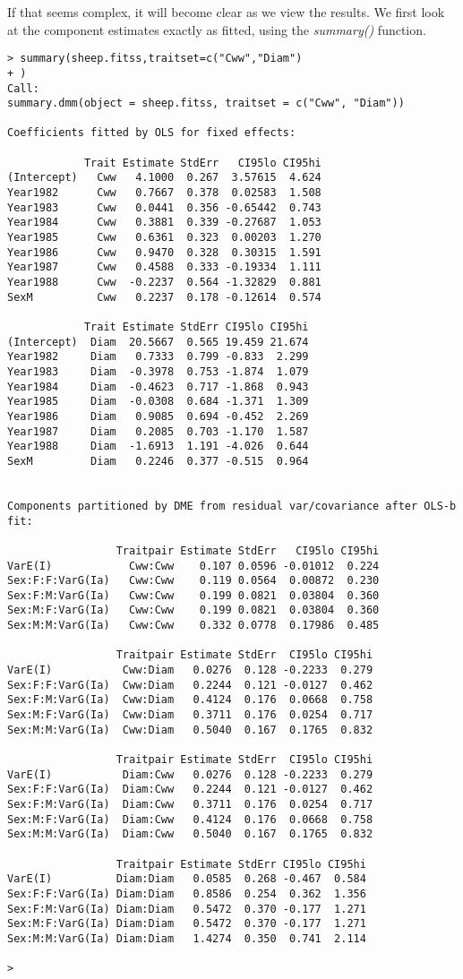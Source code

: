 \documentclass[titlepage]{article}  %
\begin{document}
If that seems complex, it will become clear as we view the results. We first look at the component estimates exactly as fitted, using the {\em summary()} function.
\begin{verbatim}
> summary(sheep.fitss,traitset=c("Cww","Diam")
+ )
Call:
summary.dmm(object = sheep.fitss, traitset = c("Cww", "Diam"))

Coefficients fitted by OLS for fixed effects:

            Trait Estimate StdErr   CI95lo CI95hi
(Intercept)   Cww   4.1000  0.267  3.57615  4.624
Year1982      Cww   0.7667  0.378  0.02583  1.508
Year1983      Cww   0.0441  0.356 -0.65442  0.743
Year1984      Cww   0.3881  0.339 -0.27687  1.053
Year1985      Cww   0.6361  0.323  0.00203  1.270
Year1986      Cww   0.9470  0.328  0.30315  1.591
Year1987      Cww   0.4588  0.333 -0.19334  1.111
Year1988      Cww  -0.2237  0.564 -1.32829  0.881
SexM          Cww   0.2237  0.178 -0.12614  0.574

            Trait Estimate StdErr CI95lo CI95hi
(Intercept)  Diam  20.5667  0.565 19.459 21.674
Year1982     Diam   0.7333  0.799 -0.833  2.299
Year1983     Diam  -0.3978  0.753 -1.874  1.079
Year1984     Diam  -0.4623  0.717 -1.868  0.943
Year1985     Diam  -0.0308  0.684 -1.371  1.309
Year1986     Diam   0.9085  0.694 -0.452  2.269
Year1987     Diam   0.2085  0.703 -1.170  1.587
Year1988     Diam  -1.6913  1.191 -4.026  0.644
SexM         Diam   0.2246  0.377 -0.515  0.964


Components partitioned by DME from residual var/covariance after OLS-b fit:

                 Traitpair Estimate StdErr   CI95lo CI95hi
VarE(I)            Cww:Cww    0.107 0.0596 -0.01012  0.224
Sex:F:F:VarG(Ia)   Cww:Cww    0.119 0.0564  0.00872  0.230
Sex:F:M:VarG(Ia)   Cww:Cww    0.199 0.0821  0.03804  0.360
Sex:M:F:VarG(Ia)   Cww:Cww    0.199 0.0821  0.03804  0.360
Sex:M:M:VarG(Ia)   Cww:Cww    0.332 0.0778  0.17986  0.485

                 Traitpair Estimate StdErr  CI95lo CI95hi
VarE(I)           Cww:Diam   0.0276  0.128 -0.2233  0.279
Sex:F:F:VarG(Ia)  Cww:Diam   0.2244  0.121 -0.0127  0.462
Sex:F:M:VarG(Ia)  Cww:Diam   0.4124  0.176  0.0668  0.758
Sex:M:F:VarG(Ia)  Cww:Diam   0.3711  0.176  0.0254  0.717
Sex:M:M:VarG(Ia)  Cww:Diam   0.5040  0.167  0.1765  0.832

                 Traitpair Estimate StdErr  CI95lo CI95hi
VarE(I)           Diam:Cww   0.0276  0.128 -0.2233  0.279
Sex:F:F:VarG(Ia)  Diam:Cww   0.2244  0.121 -0.0127  0.462
Sex:F:M:VarG(Ia)  Diam:Cww   0.3711  0.176  0.0254  0.717
Sex:M:F:VarG(Ia)  Diam:Cww   0.4124  0.176  0.0668  0.758
Sex:M:M:VarG(Ia)  Diam:Cww   0.5040  0.167  0.1765  0.832

                 Traitpair Estimate StdErr CI95lo CI95hi
VarE(I)          Diam:Diam   0.0585  0.268 -0.467  0.584
Sex:F:F:VarG(Ia) Diam:Diam   0.8586  0.254  0.362  1.356
Sex:F:M:VarG(Ia) Diam:Diam   0.5472  0.370 -0.177  1.271
Sex:M:F:VarG(Ia) Diam:Diam   0.5472  0.370 -0.177  1.271
Sex:M:M:VarG(Ia) Diam:Diam   1.4274  0.350  0.741  2.114

> 
\end{verbatim}
\end{document}
